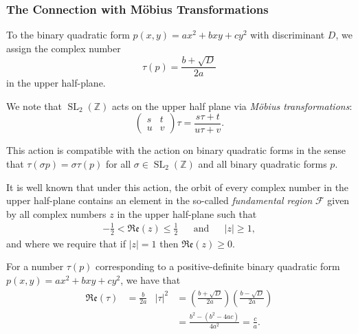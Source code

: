 \documentclass{beamer}
\begin{document}
\begin{frame}
	
	\frametitle{The Connection with M\"obius Transformations}

	To the binary quadratic form $p(x, y) = ax^2 + bxy + cy^2$ with discriminant $D$, we assign the complex number
	\[
		\tau(p) = \frac{b + \sqrt{D}}{2a}
	\]
	in the upper half-plane. \pause

	We note that $\operatorname{SL}_2(\mathbb{Z})$ acts on the upper half plane via \emph{M\"obius transformations}:
	\[
		\begin{pmatrix} s & t \\ u & v \end{pmatrix} \tau = \frac{s \tau + t}{u \tau + v}.
	\]
	\pause

	This action is compatible with the action on binary quadratic forms in the sense that $\tau (\sigma p) = \sigma \tau(p)$ for all $\sigma \in \operatorname{SL}_2(\mathbb{Z})$ and all binary quadratic forms $p$. \pause

\end{frame}

\begin{frame}
	
	It is well known that under this action, the orbit of every complex number in the upper half-plane contains an element in the so-called \emph{fundamental region} $\mathcal{F}$ given by all complex numbers $z$ in the upper half-plane such that
	\begin{align*}
		-\frac{1}{2} < \mathfrak{Re}(z) \leq \frac{1}{2} && \text{and} && |z| \geq 1,
	\end{align*}
	and where we require that if $|z| = 1$ then $\mathfrak{Re}(z) \geq 0$.
	\pause
	
	For a number $\tau(p)$ corresponding to a positive-definite binary quadratic form $p(x, y) = ax^2 + bxy + cy^2$, we have that
	\begin{align*}
		\mathfrak{Re}(\tau) & = \frac{b}{2a} & {|\tau|}^2 & = \left(\frac{b + \sqrt{D}}{2a}\right)\left(\frac{b - \sqrt{D}}{2a}\right) \\
		& & & = \frac{b^2 - (b^2 - 4ac)}{4a^2} = \frac{c}{a}.
	\end{align*}
	
\end{frame}
\end{document}
